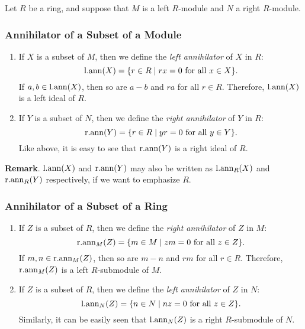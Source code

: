 \documentclass[12pt]{article}
\begin{document}
Let $R$ be a ring, and suppose that $M$ is a left $R$-module and $N$ a right $R$-module.

\subsubsection*{Annihilator of a Subset of a Module}

\begin{enumerate}
\item
If $X$ is a subset of $M$, 
then we define the {\it left annihilator} of $X$ in $R$:
$${\rm l.ann}(X) = \{ r \in R \mid rx = 0 \text{ for all } x \in X \}.$$
If $a,b\in {\rm l.ann}(X)$, then so are $a-b$ and $ra$ for all $r\in R$.  Therefore, ${\rm l.ann}(X)$ is a left ideal of $R$.
\item
If $Y$ is a subset of $N$, 
then we define the {\it right annihilator} of $Y$ in $R$:
$${\rm r.ann}(Y) = \{ r \in R \mid yr = 0 \text{ for all } y \in Y \}.$$
Like above, it is easy to see that ${\rm r.ann}(Y)$ is a right ideal of $R$.
\end{enumerate}

\textbf{Remark}.  ${\rm l.ann}(X)$ and ${\rm r.ann}(Y)$ may also be written as ${\rm l.ann}_R(X)$ and ${\rm r.ann}_R(Y)$ respectively, if we want to emphasize $R$.

\subsubsection*{Annihilator of a Subset of a Ring}

\begin{enumerate}
\item
If $Z$ is a subset of $R$, 
then we define the {\it right annihilator} of $Z$ in $M$:
$${\rm r.ann}_M(Z) = \{ m \in M \mid zm = 0 \text{ for all } z \in Z \}.$$
If $m,n\in {\rm r.ann}_M(Z)$, then so are $m-n$ and $rm$ for all $r\in R$.  Therefore, ${\rm r.ann}_M(Z)$ is a left $R$-submodule of $M$.
\item
If $Z$ is a subset of $R$, 
then we define the {\it left annihilator} of $Z$ in $N$:
$${\rm l.ann}_N(Z) = \{ n \in N \mid nz = 0 \text{ for all } z \in Z \}.$$
Similarly, it can be easily seen that ${\rm l.ann}_N(Z)$ is a right $R$-submodule of $N$.
\end{enumerate}
\end{document}
